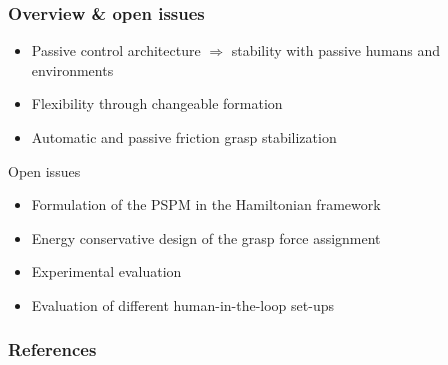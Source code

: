 \documentclass[student]{ITRslides}
\begin{document}
\begin{frame}
	\frametitle{Overview \& open issues}
	\begin{itemize}
		\item Passive control architecture $\Rightarrow$ stability with passive humans and environments
		\item Flexibility through changeable formation
		\item Automatic and passive friction grasp stabilization 
	\end{itemize}
		\begin{block}{Open issues}
\begin{itemize}
\item Formulation of the PSPM in the Hamiltonian framework
\item Energy conservative design of the grasp force assignment
\item Experimental evaluation
\item Evaluation of different human-in-the-loop set-ups
\end{itemize}
	\end{block}	
\end{frame}
\appendix
\begin{frame}[allowframebreaks]
	\frametitle{References}
	\printbibliography
\end{frame}
\end{document}
